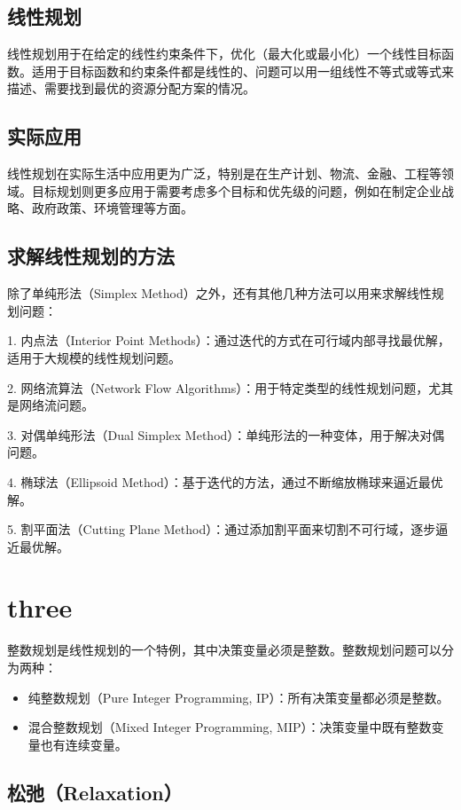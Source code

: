 \documentclass[12pt, a4paper, oneside]{ctexart}
\begin{document}
\subsection{线性规划}

线性规划用于在给定的线性约束条件下，优化（最大化或最小化）一个线性目标函数。适用于目标函数和约束条件都是线性的、问题可以用一组线性不等式或等式来描述、需要找到最优的资源分配方案的情况。

\subsection{实际应用}

线性规划在实际生活中应用更为广泛，特别是在生产计划、物流、金融、工程等领域。目标规划则更多应用于需要考虑多个目标和优先级的问题，例如在制定企业战略、政府政策、环境管理等方面。

\subsection{求解线性规划的方法}

除了单纯形法（Simplex Method）之外，还有其他几种方法可以用来求解线性规划问题：

1. 内点法（Interior Point Methods）：通过迭代的方式在可行域内部寻找最优解，适用于大规模的线性规划问题。

2. 网络流算法（Network Flow Algorithms）：用于特定类型的线性规划问题，尤其是网络流问题。

3. 对偶单纯形法（Dual Simplex Method）：单纯形法的一种变体，用于解决对偶问题。

4. 椭球法（Ellipsoid Method）：基于迭代的方法，通过不断缩放椭球来逼近最优解。

5. 割平面法（Cutting Plane Method）：通过添加割平面来切割不可行域，逐步逼近最优解。

\section{three}
整数规划是线性规划的一个特例，其中决策变量必须是整数。整数规划问题可以分为两种：

\begin{itemize}
  \item 纯整数规划（Pure Integer Programming, IP）：所有决策变量都必须是整数。
  \item 混合整数规划（Mixed Integer Programming, MIP）：决策变量中既有整数变量也有连续变量。
\end{itemize}

\subsection{松弛（Relaxation）}
\end{document}
